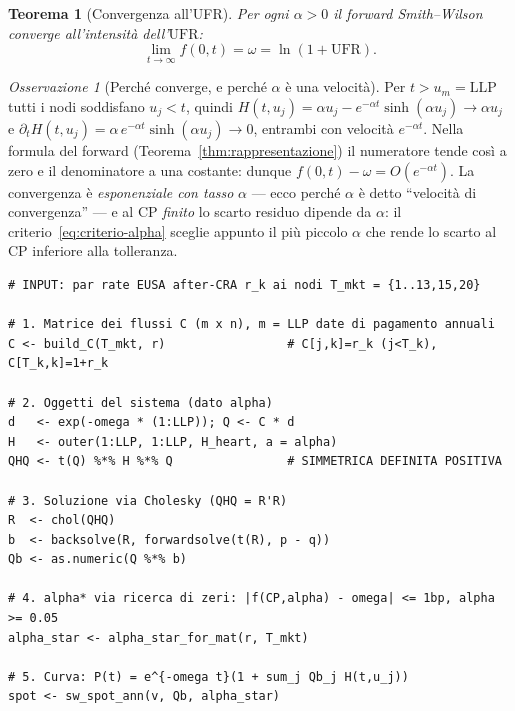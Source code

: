 \documentclass[11pt,a4paper]{article}
\theoremstyle{plain}
\newtheorem{teorema}{Teorema}[section]
\theoremstyle{definition}
\theoremstyle{remark}
\newtheorem*{osservazione}{Osservazione}
\newcommand{\UFR}{\ensuremath{\mathrm{UFR}}}
\newcommand{\LLP}{\ensuremath{\mathrm{LLP}}}
\newcommand{\CP}{\ensuremath{\mathrm{CP}}}
\begin{document}
\begin{teorema}[Convergenza all'UFR]
\label{thm:convergenza}
Per ogni $\alpha>0$ il forward Smith--Wilson converge all'intensit\`a dell'$\UFR$:
\[
  \lim_{t\to\infty} f(0,t) = \omega = \ln(1+\UFR).
\]
\end{teorema}

\begin{osservazione}[Perch\'e converge, e perch\'e $\alpha$ \`e una velocit\`a]
Per $t > u_m = \LLP$ tutti i nodi soddisfano $u_j < t$, quindi
$H(t,u_j) = \alpha u_j - e^{-\alpha t}\sinh(\alpha u_j) \to \alpha u_j$ e
$\partial_t H(t,u_j) = \alpha\, e^{-\alpha t}\sinh(\alpha u_j) \to 0$, entrambi con
velocit\`a $e^{-\alpha t}$. Nella formula del forward
(Teorema~\ref{thm:rappresentazione}) il numeratore tende cos\`i a zero e il denominatore a
una costante: dunque $f(0,t)-\omega = O(e^{-\alpha t})$. La convergenza \`e
\emph{esponenziale con tasso} $\alpha$ --- ecco perch\'e $\alpha$ \`e detto ``velocit\`a di
convergenza'' --- e al $\CP$ \emph{finito} lo scarto residuo dipende da $\alpha$: il
criterio~\eqref{eq:criterio-alpha} sceglie appunto il pi\`u piccolo $\alpha$ che rende lo
scarto al $\CP$ inferiore alla tolleranza.
\end{osservazione}

\begin{algobox}
\begin{Verbatim}[fontsize=\small]
# INPUT: par rate EUSA after-CRA r_k ai nodi T_mkt = {1..13,15,20}

# 1. Matrice dei flussi C (m x n), m = LLP date di pagamento annuali
C <- build_C(T_mkt, r)                 # C[j,k]=r_k (j<T_k), C[T_k,k]=1+r_k

# 2. Oggetti del sistema (dato alpha)
d   <- exp(-omega * (1:LLP)); Q <- C * d
H   <- outer(1:LLP, 1:LLP, H_heart, a = alpha)
QHQ <- t(Q) %*% H %*% Q                # SIMMETRICA DEFINITA POSITIVA

# 3. Soluzione via Cholesky (QHQ = R'R)
R  <- chol(QHQ)
b  <- backsolve(R, forwardsolve(t(R), p - q))
Qb <- as.numeric(Q %*% b)

# 4. alpha* via ricerca di zeri: |f(CP,alpha) - omega| <= 1bp, alpha >= 0.05
alpha_star <- alpha_star_for_mat(r, T_mkt)

# 5. Curva: P(t) = e^{-omega t}(1 + sum_j Qb_j H(t,u_j))
spot <- sw_spot_ann(v, Qb, alpha_star)
\end{Verbatim}
\end{algobox}

\end{document}
